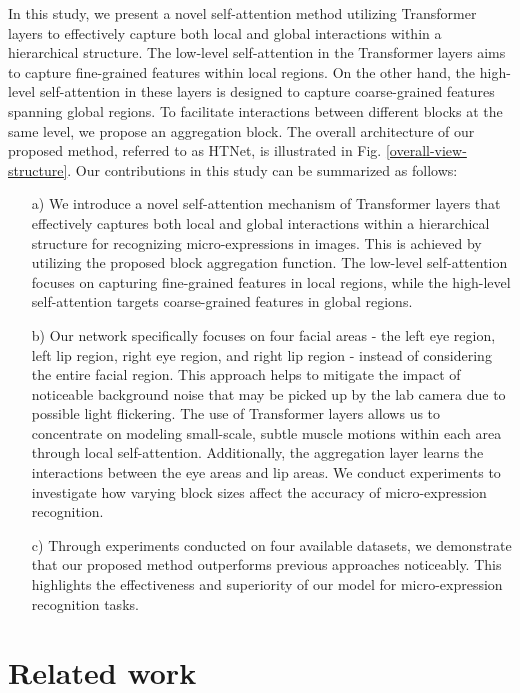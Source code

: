 \documentclass[review,12pt, 3p]{elsarticle}
\begin{document}
In this study, we present a novel self-attention method utilizing Transformer layers to effectively capture both local and global interactions within a hierarchical structure. The low-level self-attention in the Transformer layers aims to capture fine-grained features within local regions. On the other hand, the high-level self-attention in these layers is designed to capture coarse-grained features spanning global regions. To facilitate interactions between different blocks at the same level, we propose an aggregation block. The overall architecture of our proposed method, referred to as HTNet, is illustrated in Fig. \ref{overall-view-structure}. Our contributions in this study can be summarized as follows:
\begin{itemize}
  \item [a)] 
   We introduce a novel self-attention mechanism of Transformer layers that effectively captures both local and global interactions within a hierarchical structure for recognizing micro-expressions in images. This is achieved by utilizing the proposed block aggregation function. The low-level self-attention focuses on capturing fine-grained features in local regions, while the high-level self-attention targets coarse-grained features in global regions.
  \item [b)]
 Our network specifically focuses on four facial areas - the left eye region, left lip region, right eye region, and right lip region - instead of considering the entire facial region. This approach helps to mitigate the impact of noticeable background noise that may be picked up by the lab camera due to possible light flickering. The use of Transformer layers allows us to concentrate on modeling small-scale, subtle muscle motions within each area through local self-attention. Additionally, the aggregation layer learns the interactions between the eye areas and lip areas. We conduct experiments to investigate how varying block sizes affect the accuracy of micro-expression recognition.
  \item [c)]
  Through experiments conducted on four available datasets, we demonstrate that our proposed method outperforms previous approaches noticeably. This highlights the effectiveness and superiority of our model for micro-expression recognition tasks.
\end{itemize}
\section{Related work}
\end{document}
